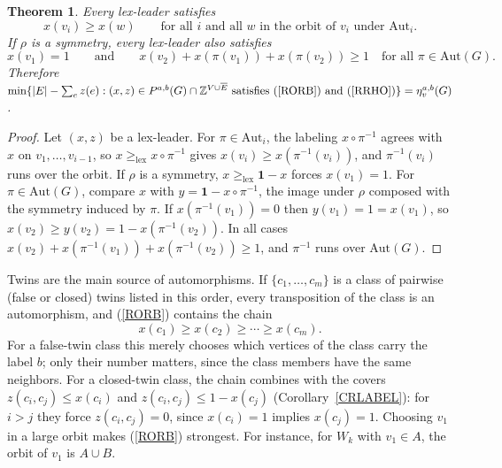 \documentclass[a4paper,11pt]{article}
\newcommand{\Z}{\mathbb{Z}}
\newcommand{\Eb}{\overline{E}}
\newcommand{\etav}{\eta_v^{a,b}}
\newtheorem{thm}{Theorem}
\theoremstyle{definition}
\begin{document}
\begin{thm} \label{TSB}
Every lex-leader satisfies
\begin{equation} \label{RORB}
x(v_i) \geq x(w) \qquad \textrm{for all } i \textrm{ and all } w \textrm{ in the orbit of } v_i \textrm{ under } \mathrm{Aut}_i.
\end{equation}
If $\rho$ is a symmetry, every lex-leader also satisfies
\begin{equation} \label{RRHO}
x(v_1) = 1 \qquad \textrm{and} \qquad x(v_2) + x(\pi(v_1)) + x(\pi(v_2)) \geq 1 \quad \textrm{for all } \pi \in \mathrm{Aut}(G).
\end{equation}
Therefore $\min \{ |E| - \sum_e z(e) : (x,z) \in P^{a,b}(G) \cap \Z^{V \cup \Eb} \textrm{ satisfies (\ref{RORB}) and (\ref{RRHO})} \} = \etav(G)$.
\end{thm}
\begin{proof}
Let $(x,z)$ be a lex-leader. For $\pi \in \mathrm{Aut}_i$, the labeling $x \circ \pi^{-1}$ agrees with $x$ on $v_1, \ldots, v_{i-1}$, so
$x \geq_{\mathrm{lex}} x \circ \pi^{-1}$ gives $x(v_i) \geq x(\pi^{-1}(v_i))$, and $\pi^{-1}(v_i)$ runs over the orbit. If $\rho$ is a symmetry,
$x \geq_{\mathrm{lex}} \mathbf{1} - x$ forces $x(v_1) = 1$. For $\pi \in \mathrm{Aut}(G)$, compare $x$ with $y = \mathbf{1} - x \circ \pi^{-1}$, the image under
$\rho$ composed with the symmetry induced by $\pi$. If $x(\pi^{-1}(v_1)) = 0$ then $y(v_1) = 1 = x(v_1)$, so $x(v_2) \geq y(v_2) = 1 - x(\pi^{-1}(v_2))$.
In all cases $x(v_2) + x(\pi^{-1}(v_1)) + x(\pi^{-1}(v_2)) \geq 1$, and $\pi^{-1}$ runs over $\mathrm{Aut}(G)$.
\end{proof}

Twins are the main source of automorphisms. If $\{c_1, \ldots, c_m\}$ is a class of pairwise (false or closed) twins listed in this order, every
transposition of the class is an automorphism, and (\ref{RORB}) contains the chain
$$x(c_1) \geq x(c_2) \geq \cdots \geq x(c_m).$$
For a false-twin class this merely chooses which vertices of the class carry the label $b$; only their number matters, since the class
members have the same neighbors. For a closed-twin class, the chain combines with the covers $z(c_i, c_j) \leq x(c_i)$ and
$z(c_i, c_j) \leq 1 - x(c_j)$ (Corollary~\ref{CRLABEL}): for $i > j$ they force $z(c_i,c_j) = 0$, since $x(c_i) = 1$ implies $x(c_j) = 1$. Choosing $v_1$ in a large orbit makes (\ref{RORB}) strongest. For instance, for $W_k$ with $v_1 \in A$, the orbit of $v_1$ is $A \cup B$.

\medskip
\end{document}
